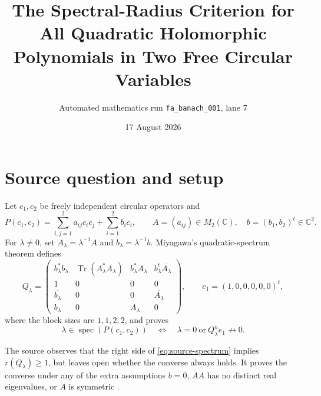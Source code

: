 \documentclass[11pt]{article}
\title{The Spectral-Radius Criterion for All Quadratic Holomorphic Polynomials in Two Free Circular Variables}
\author{Automated mathematics run \texttt{fa\_banach\_001}, lane 7}
\date{17 August 2026}
\newcommand{\C}{\mathbb C}
\newcommand{\specop}{\operatorname{spec}}
\newcommand{\tr}{\operatorname{Tr}}
\begin{document}
\maketitle

\begin{center}
\end{center}

\section{Source question and setup}

Let $c_1,c_2$ be freely independent circular operators and
\[
 P(c_1,c_2)=\sum_{i,j=1}^2 a_{ij}c_ic_j+\sum_{i=1}^2 b_i c_i,
 \qquad A=(a_{ij})\in M_2(\C),\quad b=(b_1,b_2)^t\in\C^2.
\]
For $\lambda\ne0$, set $A_\lambda=\lambda^{-1}A$ and
$b_\lambda=\lambda^{-1}b$.  Miyagawa's quadratic-spectrum theorem
\cite[Theorem~1.4 and Theorem~4.6]{Miyagawa} defines
\begin{equation}\label{eq:Q}
 Q_\lambda=
 \begin{pmatrix}
 b_\lambda^*b_\lambda&\tr(A_\lambda^*A_\lambda)&
 b_\lambda^*A_\lambda&b_\lambda^t\overline{A_\lambda}\\
 1&0&0&0\\
 \overline{b_\lambda}&0&0&\overline{A_\lambda}\\
 b_\lambda&0&A_\lambda&0
 \end{pmatrix},
 \qquad e_1=(1,0,0,0,0,0)^t,
\end{equation}
where the block sizes are $1,1,2,2$, and proves
\begin{equation}\label{eq:source-spectrum}
 \lambda\in\specop(P(c_1,c_2))
 \quad\Longleftrightarrow\quad
 \lambda=0\ \text{or}\ Q_\lambda^n e_1\not\longrightarrow0.
\end{equation}

The source observes that the right side of \eqref{eq:source-spectrum} implies
$r(Q_\lambda)\ge1$, but leaves open whether the converse always holds.  It
proves the converse under any of the extra assumptions $b=0$,
$\overline A A$ has no distinct real eigenvalues, or $A$ is symmetric
\cite[Remark~1.5 and Remark~4.7]{Miyagawa}.
\end{document}
